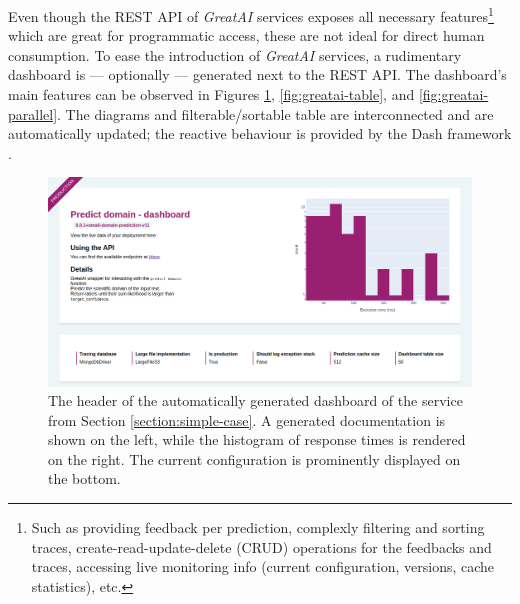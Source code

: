 Even though the REST API of \textit{GreatAI} services exposes all necessary features\footnote{Such as providing feedback per prediction, complexly filtering and sorting traces, create-read-update-delete (CRUD) operations for the feedbacks and traces, accessing live monitoring info (current configuration, versions, cache statistics), etc.} which are great for programmatic access, these are not ideal for direct human consumption. To ease the introduction of \textit{GreatAI} services, a rudimentary dashboard is --- optionally --- generated next to the REST API. The dashboard's main features can be observed in Figures \ref{fig:greatai-header}, \ref{fig:greatai-table}, and \ref{fig:greatai-parallel}. The diagrams and filterable/sortable table are interconnected and are automatically updated; the reactive behaviour is provided by the Dash framework \cite{shammamah_hossain-proc-scipy-2019}.

\begin{figure}
    \centering
    \includegraphics[width=1\textwidth]{figures/greatai-header.png}
    \captionsetup{width=.9\linewidth}
    \caption{The header of the automatically generated dashboard of the service from Section \ref{section:simple-case}. A generated documentation is shown on the left, while the histogram of response times is rendered on the right. The current configuration is prominently displayed on the bottom.}
    \label{fig:greatai-header}
\end{figure}

